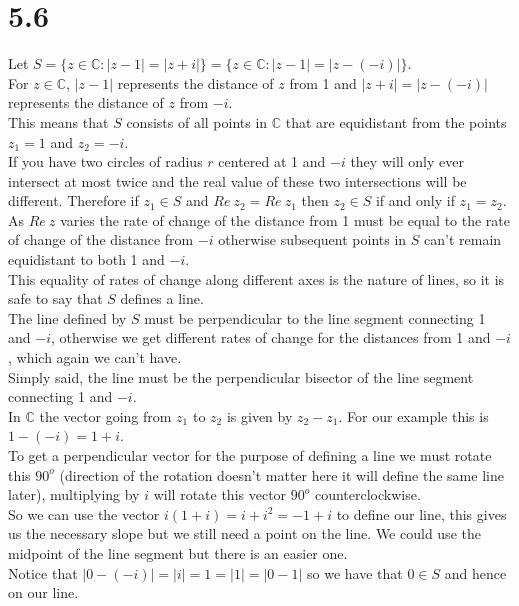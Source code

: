 \documentclass{article}
\begin{document}
\section*{5.6}
\begin{center}
    \doublespacing
    Let $S = \{z\in\mathbb{C}: |z - 1| = | z + i|\} = \{z\in\mathbb{C}: |z - 1| = |z - (-i)|\}$.
    \\For $z\in\mathbb{C}$, $|z - 1|$ represents the distance of $z$ from 1 and $|z + i| = |z - (-i)|$ represents the distance of $z$ from $-i$.
    \\This means that $S$ consists of all points in $\mathbb{C}$ that are equidistant from the points $z_1 = 1$ and $z_2 = -i$.
    \\If you have two circles of radius $r$ centered at 1 and $-i$ they will only ever intersect at most twice and the real value of these two intersections will be different. Therefore if $z_1\in S$ and $Re\:z_2 = Re\:z_1$ then $z_2\in S$ if and only if $z_1 = z_2$.
    \break
    \\As $Re\:z$ varies the rate of change of the distance from 1 must be equal to the rate of change of the distance from $-i$ otherwise subsequent points in $S$ can't remain equidistant to both 1 and $-i$.
    \\This equality of rates of change along different axes is the nature of lines, so it is safe to say that $S$ defines a line.
    \\The line defined by $S$ must be perpendicular to the line segment connecting 1 and $-i$, otherwise we get different rates of change for the distances from 1 and $-i$, which again we can't have.
    \\Simply said, the line must be the perpendicular bisector of the line segment connecting 1 and $-i$.
    \break
    \\In $\mathbb{C}$ the vector going from $z_1$ to $z_2$ is given by $z_2 - z_1$. For our example this is $1 - (-i) = 1 + i$.
    \\To get a perpendicular vector for the purpose of defining a line we must rotate this $90^o$ (direction of the rotation doesn't matter here it will define the same line later), multiplying by $i$ will rotate this vector $90^o$ counterclockwise.
    \\So we can use the vector $i(1 + i) = i + i^2 = -1 + i$ to define our line, this gives us the necessary slope but we still need a point on the line. We could use the midpoint of the line segment but there is an easier one.
    \\Notice that $|0 - (-i)| = |i| = 1 = |1| = |0 - 1|$ so we have that $0\in S$ and hence on our line.

\end{center}
\end{document}
